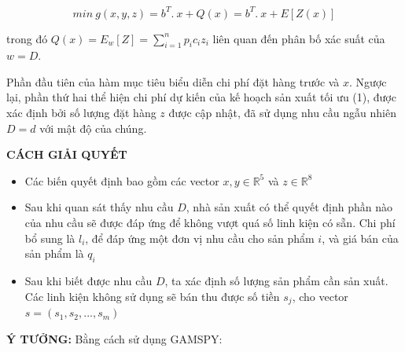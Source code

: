 \documentclass[a4paper]{article}
\begin{document}
\[
min~g(x,y,z) = b^T.~x + Q(x) = b^T.~x + E[Z(x)] \tag{2}
\]

{trong đó $Q(x)=E_w[Z]=\sum \limits_{i=1}^{n}p_ic_iz_i$ liên quan đến phân bố xác suất của $w=D$.}

{Phần đầu tiên của hàm mục tiêu biểu diễn chi phí đặt hàng trước và $x$. Ngược lại, phần thứ hai thể hiện chi phí dự kiến của kế hoạch sản xuất tối ưu (1), được xác định bởi số lượng đặt hàng $z$ được cập nhật, đã sử dụng nhu cầu ngẫu nhiên $D=d$ với mật độ của chúng.}

{\textbf{CÁCH GIẢI QUYẾT}}

\begin{itemize}
    \item {Các biến quyết định bao gồm các vector $x,y \in \mathbb{R}^5$ và $z \in \mathbb{R}^8$}
    \item {Sau khi quan sát thấy nhu cầu $D$, nhà sản xuất có thể quyết định phần nào của nhu cầu sẽ được đáp ứng để không vượt quá số linh kiện có sẵn. Chi phí bổ sung là $l_i$, để đáp ứng một đơn vị nhu cầu cho sản phẩm $i$, và giá bán của sản phẩm là $q_i$ }
    \item {Sau khi biết được nhu cầu $D$, ta xác định số lượng sản phẩm cần sản xuất. Các linh kiện không sử dụng sẽ bán thu được số tiền $s_j$, cho vector $s=(s_1, s_2,..., s_m)$}
\end{itemize}
\newpage
{\textbf{Ý TƯỞNG: }}{Bằng cách sử dụng GAMSPY:}
\end{document}
